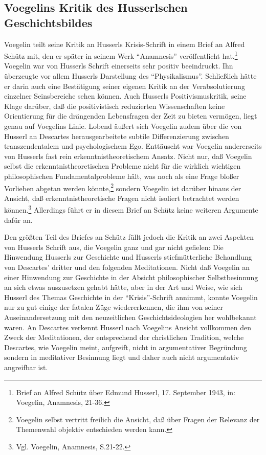 \subsection{Voegelins Kritik des Husserlschen Geschichtsbildes}

Voegelin teilt seine Kritik an Husserls Krisis-Schrift in einem Brief an
Alfred Schütz mit, den er später in seinem Werk "`Anamnesis"' veröffentlicht
hat.\footnote{Brief an Alfred Schütz über Edmund Husserl, 17.  September 1943,
  in: Voegelin, Anamnesis, 21-36.} Voegelin war von Husserls Schrift
einerseits sehr positiv beeindruckt. Ihn überzeugte vor allem Husserls
Darstellung des "`Physikalismus"'. Schließlich hätte er darin auch eine
Bestätigung seiner eigenen Kritik an der Verabsolutierung einzelner
Seinsbereiche sehen können. Auch Husserls Positivismuskritik, seine Klage
darüber, daß die positivistisch reduzierten Wissenschaften keine Orientierung
für die drängenden Lebensfragen der Zeit zu bieten vermögen, liegt genau auf
Voegelins Linie. Lobend äußert sich Voegelin zudem über die von Husserl an
Descartes herausgearbeitete subtile Differenzierung zwischen transzendentalem
und psychologischem Ego. Enttäuscht war Voegelin andererseits von Husserls
fast rein erkenntnistheoretischem Ansatz. Nicht nur, daß Voegelin selbst die
erkenntnistheoretischen Probleme nicht für die wirklich wichtigen
philosophischen Fundamentalprobleme hält, was noch als eine Frage bloßer
Vorlieben abgetan werden könnte,\footnote{Voegelin selbst vertritt freilich
  die Ansicht, daß über Fragen der Relevanz der Themenwahl objektiv
  entschieden werden kann.} sondern Voegelin ist darüber hinaus der Ansicht,
daß erkenntnistheoretische Fragen nicht isoliert betrachtet werden
können.\footnote{Vgl. Voegelin, Anamnesis, S.21-22.} Allerdings führt er in
diesem Brief an Schütz keine weiteren Argumente dafür an.
 
Den größten Teil des Briefes an Schütz füllt jedoch die Kritik an zwei
Aspekten von Husserls Schrift aus, die Voegelin ganz und gar nicht gefielen:
Die Hinwendung Husserls zur Geschichte und Husserls stiefmütterliche
Behandlung von Descartes' dritter und den folgenden Meditationen. Nicht daß
Voegelin an einer Hinwendung zur Geschichte in der Absicht philosophischer
Selbstbesinnung an sich etwas auszusetzen gehabt hätte, aber in der Art und
Weise, wie sich Husserl des Themas Geschichte in der "`Krisis"'-Schrift
annimmt, konnte Voegelin nur zu gut einige der fatalen Züge wiedererkennen,
die ihm von seiner Auseinandersetzung mit den neuzeitlichen
Geschichtsideologien her wohlbekannt waren. An Descartes verkennt Husserl
nach Voegelins Ansicht vollkommen den Zweck der Meditationen, der
entsprechend der christlichen Tradition, welche Descartes, wie Voegelin meint,
aufgreift, nicht in argumentativer Begründung sondern in meditativer
Besinnung liegt und daher auch nicht argumentativ angreifbar ist.


